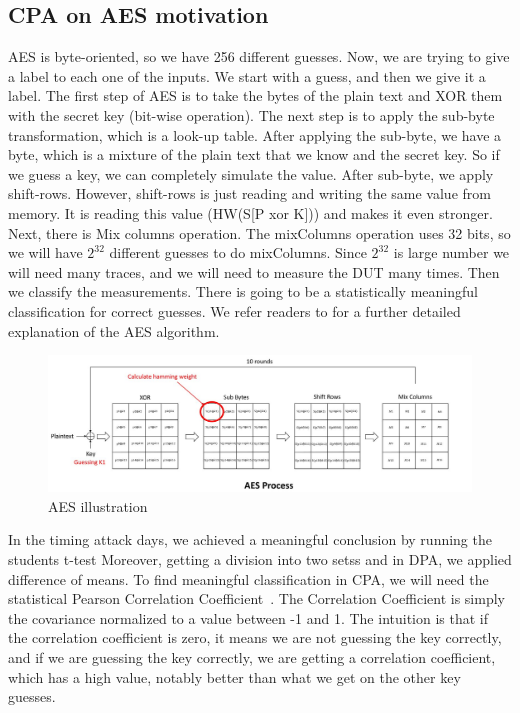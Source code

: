 \subsection{CPA on AES motivation}

AES \cite{anderson1998serpent} is byte-oriented, so we have 256 different guesses. Now, we are trying to
give a label to each one of the inputs. We start with a guess, and then we give it
a label. The first step of AES is to take the bytes of the plain text and XOR
them with the secret key (bit-wise operation). The next step is to apply the sub-byte
transformation, which is a look-up table. After applying the sub-byte, we
have a byte, which is a mixture of the plain text that we know and the secret key. So if we guess a key, we can completely simulate the value. After
sub-byte, we apply shift-rows. However, shift-rows is just reading and writing the same
value from memory. It is reading this value (HW(S[P xor K])) and makes it
even stronger. Next, there is Mix columns operation. The mixColumns operation
uses 32 bits, so we will have $2^{32}$ different guesses to do mixColumns. Since $2^{32}$
is large number we will need many traces, and we will need to measure the DUT many times. Then we classify the measurements. There is going to be a statistically
meaningful classification for correct guesses. We refer readers to \cite{AESDescription} 
for a further detailed explanation of the AES algorithm.

\begin{figure}[!ht]
    \centering
    \includegraphics[width=1.0\textwidth]{images/chapter8/aes_process.jpg}
    \caption{AES illustration} \label{c8_aes:fig}
\end{figure}

In the timing attack days, we achieved a meaningful conclusion by running the students t-test
Moreover, getting a division into two setss and in DPA, we applied difference of means. To find
meaningful classification in CPA, we will need the statistical Pearson
Correlation Coefficient~\cite{PearsonCorrelationCoefficient}. The Correlation
Coefficient is simply the covariance normalized to a value between -1 and 1. The
intuition is that if the correlation coefficient is zero, it means we are
not guessing the key correctly, and if we are guessing the key correctly, we are
getting a correlation coefficient, which has a high value, notably better than what we get
on the other key guesses. 

